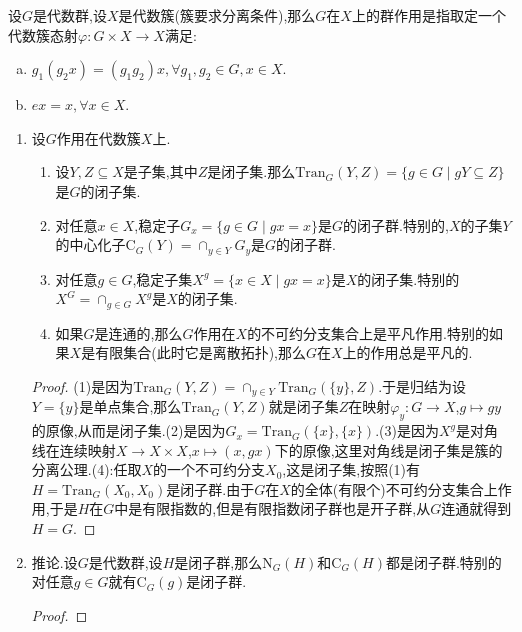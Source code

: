 设$G$是代数群,设$X$是代数簇(簇要求分离条件),那么$G$在$X$上的群作用是指取定一个代数簇态射$\varphi:G\times X\to X$满足:
\begin{enumerate}[(a)]
	\item $g_1(g_2x)=(g_1g_2)x,\forall g_1,g_2\in G,x\in X$.
	\item $ex=x,\forall x\in X$.
\end{enumerate}
\begin{enumerate}
	\item 设$G$作用在代数簇$X$上.
	\begin{enumerate}[(1)]
		\item 设$Y,Z\subseteq X$是子集,其中$Z$是闭子集.那么$\mathrm{Tran}_G(Y,Z)=\{g\in G\mid gY\subseteq Z\}$是$G$的闭子集.
		\item 对任意$x\in X$,稳定子$G_x=\{g\in G\mid gx=x\}$是$G$的闭子群.特别的,$X$的子集$Y$的中心化子$\mathrm{C}_G(Y)=\cap_{y\in Y}G_y$是$G$的闭子群.
		\item 对任意$g\in G$,稳定子集$X^g=\{x\in X\mid gx=x\}$是$X$的闭子集.特别的$X^G=\cap_{g\in G}X^g$是$X$的闭子集.
		\item 如果$G$是连通的,那么$G$作用在$X$的不可约分支集合上是平凡作用.特别的如果$X$是有限集合(此时它是离散拓扑),那么$G$在$X$上的作用总是平凡的.
	\end{enumerate}
	\begin{proof}
		
		(1)是因为$\mathrm{Tran}_G(Y,Z)=\cap_{y\in Y}\mathrm{Tran}_G(\{y\},Z)$.于是归结为设$Y=\{y\}$是单点集合,那么$\mathrm{Tran}_G(Y,Z)$就是闭子集$Z$在映射$\varphi_y:G\to X$,$g\mapsto gy$的原像,从而是闭子集.(2)是因为$G_x=\mathrm{Tran}_G(\{x\},\{x\})$.(3)是因为$X^g$是对角线在连续映射$X\to X\times X$,$x\mapsto (x,gx)$下的原像,这里对角线是闭子集是簇的分离公理.(4):任取$X$的一个不可约分支$X_0$,这是闭子集,按照(1)有$H=\mathrm{Tran}_G(X_0,X_0)$是闭子群.由于$G$在$X$的全体(有限个)不可约分支集合上作用,于是$H$在$G$中是有限指数的,但是有限指数闭子群也是开子群,从$G$连通就得到$H=G$.
	\end{proof}
	\item 推论.设$G$是代数群,设$H$是闭子群,那么$\mathrm{N}_G(H)$和$\mathrm{C}_G(H)$都是闭子群.特别的对任意$g\in G$就有$\mathrm{C}_G(g)$是闭子群.
	\begin{proof}
		

\end{proof}
\end{enumerate}
